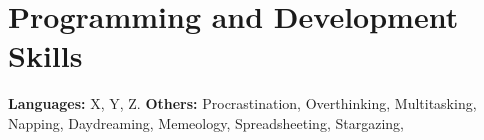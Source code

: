 \section{Programming and Development Skills}
\textbf{Languages:} X, Y, Z. \linebreak
\textbf{Others:} Procrastination, Overthinking, Multitasking,
Napping, Daydreaming, Memeology, Spreadsheeting, Stargazing,
